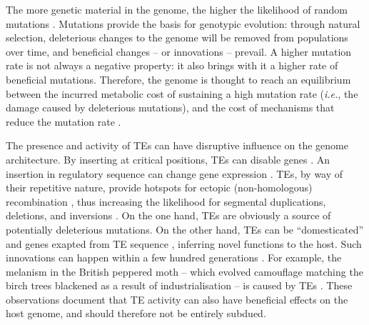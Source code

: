 The more genetic material in the genome, the higher the likelihood of
random mutations \citep{Wielgoss2011}. Mutations provide the basis for
genotypic evolution: through natural selection, deleterious changes to
the genome will be removed from populations over time, and beneficial
changes -- or innovations -- prevail. A higher mutation rate is not
always a negative property: it also brings with it a higher rate of
beneficial mutations. Therefore, the genome is thought to reach an
equilibrium between the incurred metabolic cost of sustaining a high
mutation rate (\emph{i.e.}, the damage caused by deleterious mutations),
and the cost of mechanisms that reduce the mutation rate
\citep{Bernstein1987, Altenberg2011}.

The presence and activity of TEs can have disruptive influence on the
genome architecture. By inserting at critical positions, TEs can disable
genes \citep{Kazazian1988}. An insertion in regulatory sequence can
change gene expression \citep{Warnefors2010}. TEs, by way of their
repetitive nature, provide hotspots for ectopic (non-homologous)
recombination \citep{Lim1988, Gray2000, Fiston-Lavier2007}, thus
increasing the likelihood for segmental duplications, deletions, and
inversions \citep{Mathiopoulos1998, Remnant2013}. On the one hand, TEs
are obviously a source of potentially deleterious mutations. On the
other hand, TEs can be ``domesticated'' and genes exapted from TE
sequence \citep{Gahan2001, Daborn2002, Aminetzach2005, Chen2007},
inferring novel functions to the host. Such innovations can happen
within a few hundred generations \citep{Dolgin2006, Struchiner2009,
Kofler2015}. For example, the melanism in the British peppered moth --
which evolved camouflage matching the birch trees blackened as a result
of industrialisation -- is caused by TEs \citep{Hof2016}. These
observations document that TE activity can also have beneficial effects
on the host genome, and should therefore not be entirely subdued.

